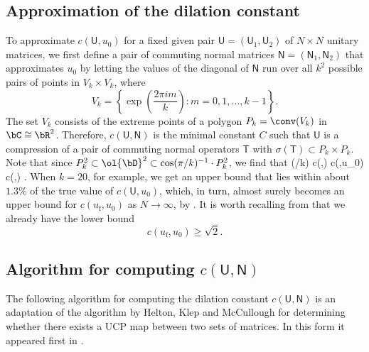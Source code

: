 \subsection{Approximation of the dilation constant}\label{subsec:approx}
To approximate $c(\mathsf{U},u_0)$ for a fixed given pair $\mathsf{U} = (\mathsf{U}_1, \mathsf{U}_2)$ of $N \times N$ unitary matrices, we first define a pair of commuting normal matrices $\mathsf{N} = (\mathsf{N}_1, \mathsf{N}_2)$ that approximates $u_0$ by letting the values of the diagonal of $\mathsf{N}$ run over all $k^2$ possible pairs of points in $V_k \times V_k$, where 
\[
V_k = \left\{ \exp\left(\frac{2\pi i m}{k}\right) : m=0,1,\ldots, k-1 \right\}. 
\]
The set $V_k$ consists of the extreme points of a polygon $P_k = \conv(V_k)$ in $\bC \cong \bR^2$. 
Therefore, $c(\mathsf{U},\mathsf{N})$ is the minimal constant $C$ such that $\mathsf{U}$ is a compression of a pair of commuting normal operators $\mathsf{T}$ with $\sigma(\mathsf{T}) \subset P_k \times P_k$. 
Note that since $P_k^2 \subset \ol{\bD}^2 \subset \cos(\pi/k)^{-1} \cdot P_k^2$, we find that 
\be\label{eq:within}
\cos(\pi/k) c(,) \leq c(,u_0) \leq c(,) .
\ee
When $k = 20$, for example, we get an upper bound that lies within about $1.3 \%$ of the true value of $c(\mathsf{U},u_0)$, which, in turn, almost surely becomes an upper bound for $c(u_{\mathrm f},u_0)$ as $N \to \infty$, by . 
It is worth recalling from  that we already have the lower bound
\[
c(u_{\mathrm f},u_0) \geq \sqrt{2}. 
\]


\subsection{Algorithm for computing \texorpdfstring{$c(\mathsf{U},\mathsf{N})$}{c(U,N)}}\label{subsec:algo}
The following algorithm for computing the dilation constant $c(\mathsf{U},\mathsf{N})$ is an adaptation of the algorithm by Helton, Klep and McCullough \cite{HKM13} for determining whether there exists a UCP map between two sets of matrices. 
In this form it appeared first in \cite{ShaBlog}. 


